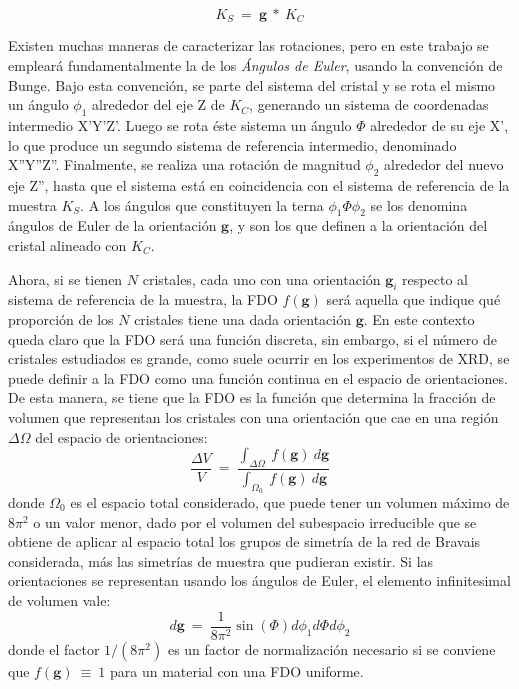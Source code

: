 \begin{equation}
  K_S \ = \ \mathbf{g} \ * \ K_C
  \label{eq:orientation}
\end{equation}
\noindent

Existen muchas maneras de caracterizar las rotaciones, pero en este trabajo se empleará fundamentalmente la de los \textit{Ángulos de Euler}, usando la convención de Bunge\cite{bunge2013texture}.
Bajo esta convención, se parte del sistema del cristal y se rota el mismo un ángulo $\phi_1$ alrededor del eje Z de $K_C$, generando un sistema de coordenadas intermedio X'Y'Z'.
Luego se rota éste sistema un ángulo $\Phi$ alrededor de su eje X', lo que produce un segundo sistema de referencia intermedio, denominado X''Y''Z''. Finalmente, se realiza una rotación de magnitud $\phi_2$ alrededor del nuevo eje Z'', hasta que el sistema está en coincidencia con el sistema de referencia de la muestra $K_S$.
A los ángulos que constituyen la terna $\phi_1 \Phi \phi_2$ se los denomina ángulos de Euler de la orientación $\mathbf{g}$, y son los que definen a la orientación del cristal alineado con $K_C$.

Ahora, si se tienen $N$ cristales, cada uno con una orientación $\mathbf{g}_i$ respecto al sistema de referencia de la muestra, la FDO $f(\mathbf{g})$ será aquella que indique qué proporción de los $N$ cristales tiene una dada orientación $\mathbf{g}$.
En este contexto queda claro que la FDO será una función discreta, sin embargo, si el número de cristales estudiados es grande, como suele ocurrir en los experimentos de XRD, se puede definir a la FDO como una función continua en el espacio de orientaciones.
De esta manera, se tiene que la FDO es la función que determina la fracción de volumen que representan los cristales con una orientación que cae en una región $\Delta \Omega$ del espacio de orientaciones\cite{kocks2000texture}:
\begin{equation}
  \frac{\Delta V}{V} \ = \ \frac{\int_{\Delta \Omega} \ f(\mathbf{g}) \ d\mathbf{g}}{\int_{\Omega_0} \ f(\mathbf{g})\ d\mathbf{g}}
  \label{eq:ODF}
\end{equation}
\noindent
donde $\Omega_0$ es el espacio total considerado, que puede tener un volumen máximo de $8\pi^2$ o un valor menor, dado por el volumen del subespacio irreducible que se obtiene de aplicar al espacio total los grupos de simetría de la red de Bravais considerada, más las simetrías de muestra que pudieran existir.
Si las orientaciones se representan usando los ángulos de Euler, el elemento infinitesimal de volumen vale:
\begin{equation}
  d\mathbf{g} \ = \ \frac{1}{8\pi^2} \sin(\Phi) d\phi_1 d\Phi d\phi_2
  \label{eq:dg}
\end{equation}
\noindent
donde el factor $1/(8\pi^2)$ es un factor de normalización necesario si se conviene que $f(\mathbf{g}) \ \equiv \ 1$ para un material con una FDO uniforme.

